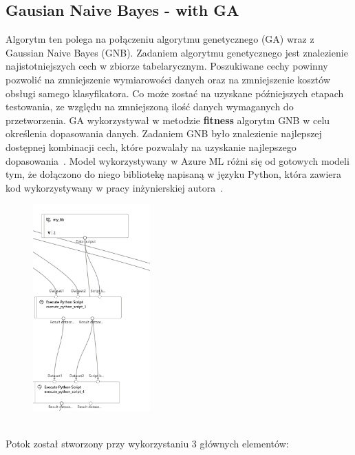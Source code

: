 \subsection{Gausian Naive Bayes - with GA}
Algorytm ten polega na połączeniu algorytmu genetycznego (GA) wraz z Gaussian Naive Bayes (GNB). Zadaniem algorytmu genetycznego jest znalezienie najistotniejszych cech w zbiorze tabelarycznym. Poszukiwane cechy powinny pozwolić na zmniejszenie wymiarowości danych oraz na zmniejszenie kosztów obsługi samego klasyfikatora. Co może zostać na uzyskane późniejszych etapach testowania, ze względu na zmniejszoną ilość danych wymaganych do przetworzenia. GA wykorzystywał w metodzie \textbf{fitness} algorytm GNB w celu określenia dopasowania danych. Zadaniem GNB było znalezienie najlepszej dostępnej kombinacji cech, które pozwalały na uzyskanie najlepszego dopasowania~\cite{Blyszcz2022}. Model wykorzystywany w Azure ML różni się od gotowych modeli tym, że dołączono do niego bibliotekę napisaną w języku Python, która zawiera kod wykorzystywany w pracy inżynierskiej autora~\cite{Suvres2023}.
\begin{figure}[H]
    \centering
    \includegraphics[width=0.4\textwidth]{images/ga_pipe}
    \label{fig:ga-pipe}
\end{figure}
\ \\
Potok został stworzony przy wykorzystaniu 3 głównych elementów:
